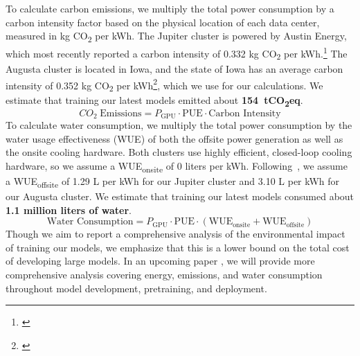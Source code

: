 \documentclass[table]{ai2style/ai2}
\begin{document}
To calculate carbon emissions, we multiply the total power consumption by a carbon intensity factor based on the physical location of each data center, measured in kg CO\textsubscript{2} per kWh. 
The Jupiter cluster is powered by Austin Energy, which most recently reported a carbon intensity of 0.332 kg CO\textsubscript{2} per kWh.\footnote{\href{https://web.archive.org/web/20230802220143/https://austinenergy.com/-/media/project/websites/austinenergy/commercial/carbonemissionscalculator.pdf}{}} 
The Augusta cluster is located in Iowa, and the state of Iowa has an average carbon intensity of 0.352 kg CO\textsubscript{2} per kWh\footnote{\href{https://web.archive.org/web/20241127181309/https://www.eia.gov/electricity/state/iowa/}{}}, which we use for our calculations. We estimate that training our latest models emitted about \textbf{154~tCO\textsubscript{2}eq}.
\begin{equation*}
    CO_2\hspace{3pt}\text{Emissions} = P_{\text{GPU}} \cdot \text{PUE} \cdot \text{Carbon Intensity}
\end{equation*}
To calculate water consumption, we multiply the total power consumption by the water usage effectiveness (WUE) of both the offsite power generation as well as the onsite cooling hardware. 
Both clusters use highly efficient, closed-loop cooling hardware, so we assume a WUE\textsubscript{onsite} of 0 liters per kWh. 
Following~\citet{wriestimatingwater}, we assume a WUE\textsubscript{offsite} of 1.29 L per kWh for our Jupiter cluster and 3.10 L per kWh for our Augusta cluster. 
We estimate that training our latest models consumed about \textbf{1.1 million liters of water}.
\begin{equation*}
    \text{Water Consumption} = P_{\text{GPU}} \cdot \text{PUE} \cdot (\text{WUE}_{\text{onsite}} + \text{WUE}_{\text{offsite}})
\end{equation*}
Though we aim to report a comprehensive analysis of the environmental impact of training our models, we emphasize that this is a lower bound on the total cost of developing large models. 
In an upcoming paper \citep{olmo-co2}, we will provide more comprehensive analysis covering energy, emissions, and water consumption throughout model development, pretraining, and deployment.
\end{document}
